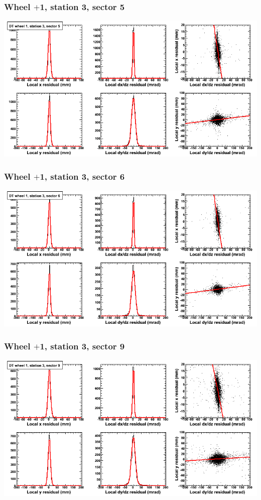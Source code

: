 \documentclass[compress]{beamer}
\begin{document}
\begin{frame}
\frametitle{Wheel $+$1, station 3, sector 5}
\includegraphics[width=\linewidth]{tmpbell_MBwhDst3sec05.png}
\end{frame}

\begin{frame}
\frametitle{Wheel $+$1, station 3, sector 6}
\includegraphics[width=\linewidth]{tmpbell_MBwhDst3sec06.png}
\end{frame}

\begin{frame}
\frametitle{Wheel $+$1, station 3, sector 9}
\includegraphics[width=\linewidth]{tmpbell_MBwhDst3sec09.png}
\end{frame}
\end{document}
